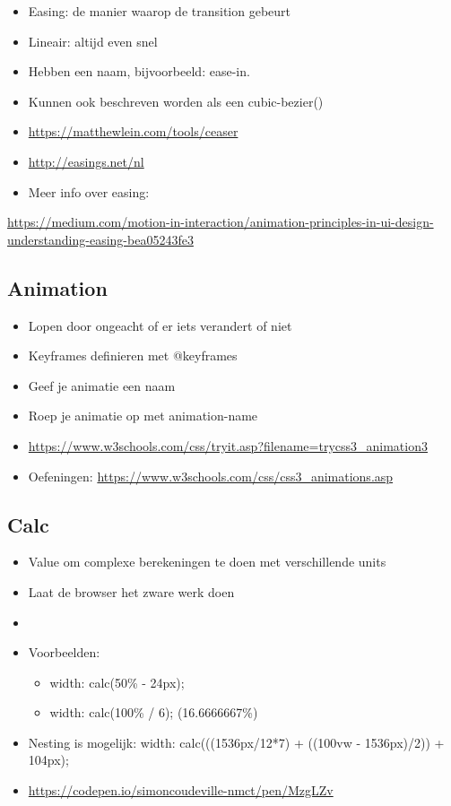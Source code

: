 \documentclass{article}
\begin{document}
\begin{itemize}
    \item Easing: de manier waarop de transition gebeurt
    \item Lineair: altijd even snel
    \item Hebben een naam, bijvoorbeeld: ease-in.
    \item Kunnen ook beschreven worden als een cubic-bezier()
    \item \url{https://matthewlein.com/tools/ceaser}
    \item \url{http://easings.net/nl}
    \item Meer info over easing: 
\end{itemize}
\url{https://medium.com/motion-in-interaction/animation-principles-in-ui-design-understanding-easing-bea05243fe3}

\subsection{Animation}

\begin{itemize}
    \item Lopen door ongeacht of er iets verandert of niet
    \item Keyframes definieren met @keyframes {}
    \item Geef je animatie een naam
    \item Roep je animatie op met animation-name
    \item \url{https://www.w3schools.com/css/tryit.asp?filename=trycss3_animation3}
    \item Oefeningen: \url{https://www.w3schools.com/css/css3_animations.asp}
\end{itemize}

\subsection{Calc}

\begin{itemize}
    \item Value om complexe berekeningen te doen met verschillende units
    \item Laat de browser het zware werk doen
    \item \item Voorbeelden:
    \begin{itemize}
        \item width: calc(50\% - 24px);
        \item width: calc(100\% / 6); (16.6666667\%)
    \end{itemize}
    \item Nesting is mogelijk: width: calc(((1536px/12*7) + ((100vw - 1536px)/2)) + 104px);
    \item \url{https://codepen.io/simoncoudeville-nmct/pen/MzgLZv}
\end{itemize}
\end{document}
